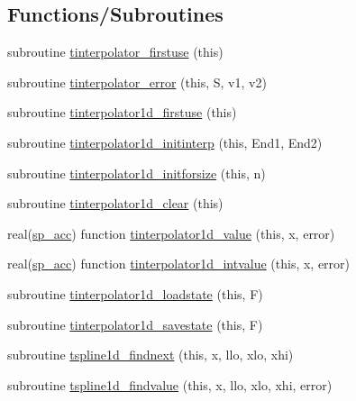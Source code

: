 \subsection*{Functions/\+Subroutines}
\begin{DoxyCompactItemize}
\item 
subroutine \mbox{\hyperlink{namespaceinterpolation_a83d34895f7c29f6feb60dee74108123a}{tinterpolator\+\_\+firstuse}} (this)
\item 
subroutine \mbox{\hyperlink{namespaceinterpolation_a6dbf131728b481585c45c2564ba688b3}{tinterpolator\+\_\+error}} (this, S, v1, v2)
\item 
subroutine \mbox{\hyperlink{namespaceinterpolation_abbd84288df284345da697e10533c07a7}{tinterpolator1d\+\_\+firstuse}} (this)
\item 
subroutine \mbox{\hyperlink{namespaceinterpolation_ab07350cec2d065eb2972b8dcabc45545}{tinterpolator1d\+\_\+initinterp}} (this, End1, End2)
\item 
subroutine \mbox{\hyperlink{namespaceinterpolation_a9c0d111d38654ca08fd15e627d8f8ad3}{tinterpolator1d\+\_\+initforsize}} (this, n)
\item 
subroutine \mbox{\hyperlink{namespaceinterpolation_a3842ef3937aaef204100599321d0b91f}{tinterpolator1d\+\_\+clear}} (this)
\item 
real(\mbox{\hyperlink{namespaceinterpolation_af72aa9a05feb8ef90b2d26e4a013abf3}{sp\+\_\+acc}}) function \mbox{\hyperlink{namespaceinterpolation_a4bc299324720bbb5a8bce547f3f10c2e}{tinterpolator1d\+\_\+value}} (this, x, error)
\item 
real(\mbox{\hyperlink{namespaceinterpolation_af72aa9a05feb8ef90b2d26e4a013abf3}{sp\+\_\+acc}}) function \mbox{\hyperlink{namespaceinterpolation_a8b3767144728c4ff1d5564b16b2b2e97}{tinterpolator1d\+\_\+intvalue}} (this, x, error)
\item 
subroutine \mbox{\hyperlink{namespaceinterpolation_a08169c4a9ace8a6318b3853d0bd9c084}{tinterpolator1d\+\_\+loadstate}} (this, F)
\item 
subroutine \mbox{\hyperlink{namespaceinterpolation_a2e4b0cd2e1a31f06c7202669b574df13}{tinterpolator1d\+\_\+savestate}} (this, F)
\item 
subroutine \mbox{\hyperlink{namespaceinterpolation_a54d9bd9ab88b402805329a4dbad1bc3d}{tspline1d\+\_\+findnext}} (this, x, llo, xlo, xhi)
\item 
subroutine \mbox{\hyperlink{namespaceinterpolation_ac80c6bb26b81ce989cad9b77fcbd66ab}{tspline1d\+\_\+findvalue}} (this, x, llo, xlo, xhi, error)
\item 

\end{DoxyCompactItemize}
